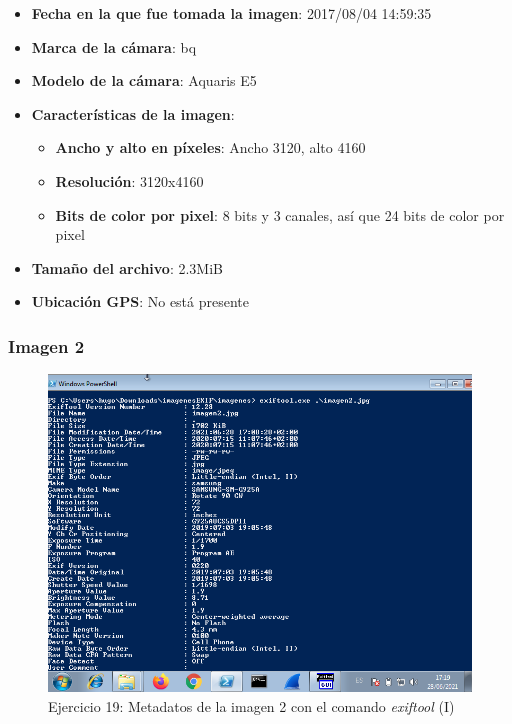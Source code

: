 \documentclass[11pt]{article}
\begin{document}
\begin{itemize}
    \item \textbf{Fecha en la que fue tomada la imagen}: 2017/08/04 14:59:35 
    \item \textbf{Marca de la cámara}: bq
    \item \textbf{Modelo de la cámara}: Aquaris E5
    \item \textbf{Características de la imagen}:
        \begin{itemize}
            \item \textbf{Ancho y alto en píxeles}: Ancho 3120, alto 4160
            \item \textbf{Resolución}: 3120x4160
            \item \textbf{Bits de color por pixel}: 8 bits y 3 canales, así que 24 bits de color por pixel
        \end{itemize}
    \item \textbf{Tamaño del archivo}: 2.3MiB
    \item \textbf{Ubicación GPS}: No está presente
\end{itemize}


\subsubsection{Imagen 2}

\begin{figure}[H]
    \caption{Ejercicio 19: Metadatos de la imagen 2 con el comando \textit{exiftool} (I)}
    \centering
    \includegraphics[scale=0.7]{p03/e19-5.png}
\end{figure}
\end{document}
